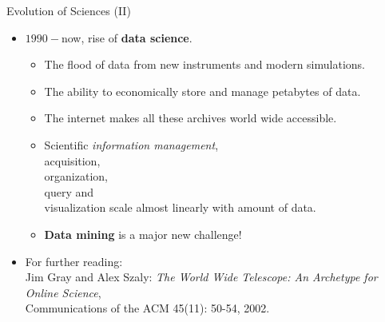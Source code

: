 \begin{frame}{Evolution of Sciences (II)}
	\begin{itemize}
		\item $1990-$now, rise of \textbf{data science}.
		      \begin{itemize}
			      \item The flood of data from new instruments and modern simulations.
			      \item The ability to economically store and manage petabytes of
			            data.
			      \item The internet makes all these archives world wide accessible.
			      \item Scientific \emph{information management}, \\
			            acquisition,\\
			            organization, \\
			            query and \\
			            visualization scale almost linearly with amount of data.
			      \item \textbf{Data mining} is a major new challenge!
		      \end{itemize}
		\item For further reading:\\
		      \small{Jim Gray and Alex Szaly: \emph{The World Wide Telescope: An
				      Archetype for Online Science}, \\ Communications of the ACM
			      45(11):
			      50-54, 2002.}
	\end{itemize}
\end{frame}

